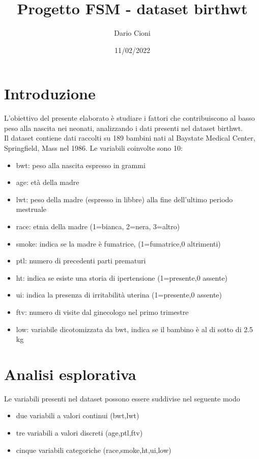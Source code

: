 \documentclass{article}\usepackage[]{graphicx}\usepackage[]{color}
\title{Progetto FSM - dataset birthwt}
\author{Dario Cioni}
\date{11/02/2022}
\begin{document}
\maketitle
\cleardoublepage


\tableofcontents
\cleardoublepage

\section{Introduzione}
L'obiettivo del presente elaborato è studiare i fattori che contribuiscono al basso peso alla nascita nei neonati, 
analizzando i dati presenti nel dataset birthwt. \\
Il dataset contiene dati raccolti su 189 bambini nati al Baystate Medical Center, Springfield, Mass nel 1986.
Le variabili coinvolte sono 10:
\begin{itemize}
\item{bwt:} peso alla nascita espresso in grammi
\item{age:} età della madre
\item{lwt:} peso della madre (espresso in libbre) alla fine dell'ultimo periodo mestruale
\item{race:} etnia della madre (1=bianca, 2=nera, 3=altro)
\item{smoke:} indica se la madre è fumatrice, (1=fumatrice,0 altrimenti)
\item{ptl:} numero di precedenti parti prematuri
\item{ht:} indica se esiste una storia di ipertensione (1=presente,0 assente)
\item{ui:} indica la presenza di irritabilità uterina (1=presente,0 assente)
\item{ftv:} numero di visite dal ginecologo nel primo trimestre
\item{low:} variabile dicotomizzata da bwt, indica se il bambino è al di sotto di 2.5 kg
\end{itemize}



\section{Analisi esplorativa}
Le variabili presenti nel dataset possono essere suddivise nel seguente modo
\begin{itemize}
\item due variabili a valori continui (bwt,lwt)
\item tre variabili a valori discreti (age,ptl,ftv)
\item cinque variabili categoriche (race,smoke,ht,ui,low)
\end{itemize}
\end{document}
